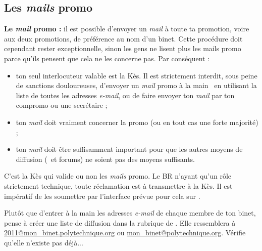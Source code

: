 \subsection{Les \emph{mails} promo}


\textbf{Le \emph{mail} promo :} il est possible d'envoyer un \emph{mail} \`a toute
ta promotion, voire aux deux promotions, de pr\'ef\'erence au nom d'un binet.
Cette proc\'edure doit cependant rester exceptionnelle, sinon les gens ne lisent plus les
mails promo parce qu'ils pensent que cela ne les concerne pas. Par
cons\'equent :
\begin{itemize}
  \item ton seul interlocuteur valable est la K\`es. Il est strictement interdit, sous peine de sanctions douloureuses, d'envoyer un \emph{mail} promo \og \`a la main \fg~en utilisant la liste de toutes les adresses \emph{e-mail},
  ou de faire envoyer ton \emph{mail} par ton compromo ou une secr\'etaire ;
  \item ton \emph{mail} doit vraiment concerner la promo (ou en tout cas une forte majorit\'e) ;
  \item ton \emph{mail} doit \^etre suffisamment important pour que les autres moyens de diffusion (\fkz\ et forums) ne soient pas des moyens suffisants.
\end{itemize}
C'est la K\`es qui valide ou non les \emph{mails} promo. Le BR n'ayant qu'un r\^ole strictement technique, toute r\'eclamation est \`a transmettre \`a la K\`es. Il est
imp\'eratif de les soumettre par l'interface pr\'evue pour cela sur \fkz.

Plut\^ot que d'entrer \`a la main les adresses \emph{e-mail} de chaque membre de ton binet, pense \`a cr\'eer une liste de diffusion dans la rubrique  de .
Elle ressemblera \`a \url{2011@mon_binet.polytechnique.org} ou \url{mon_binet@polytechnique.org}. V\'erifie qu'elle n'existe pas d\'ej\`a...
